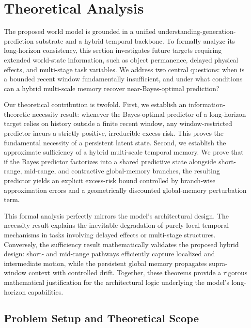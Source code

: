 \section{Theoretical Analysis}
\label{sec:theory}
The proposed world model is grounded in a unified understanding-generation-prediction substrate and a hybrid temporal backbone. To formally analyze its long-horizon consistency, this section investigates future targets requiring extended world-state information, such as object permanence, delayed physical effects, and multi-stage task variables. We address two central questions: when is a bounded recent window fundamentally insufficient, and under what conditions can a hybrid multi-scale memory recover near-Bayes-optimal prediction?

Our theoretical contribution is twofold. First, we establish an information-theoretic necessity result: whenever the Bayes-optimal predictor of a long-horizon target relies on history outside a finite recent window, any window-restricted predictor incurs a strictly positive, irreducible excess risk. This proves the fundamental necessity of a persistent latent state. Second, we establish the approximate sufficiency of a hybrid multi-scale temporal memory. We prove that if the Bayes predictor factorizes into a shared predictive state alongside short-range, mid-range, and contractive global-memory branches, the resulting predictor yields an explicit excess-risk bound controlled by branch-wise approximation errors and a geometrically discounted global-memory perturbation term.

This formal analysis perfectly mirrors the model's architectural design. The necessity result explains the inevitable degradation of purely local temporal mechanisms in tasks involving delayed effects or multi-stage structures. Conversely, the sufficiency result mathematically validates the proposed hybrid design: short- and mid-range pathways efficiently capture localized and intermediate motion, while the persistent global memory propagates supra-window context with controlled drift. Together, these theorems provide a rigorous mathematical justification for the architectural logic underlying the model's long-horizon capabilities.


\subsection{Problem Setup and Theoretical Scope}
\label{subsec:theory_setup}



